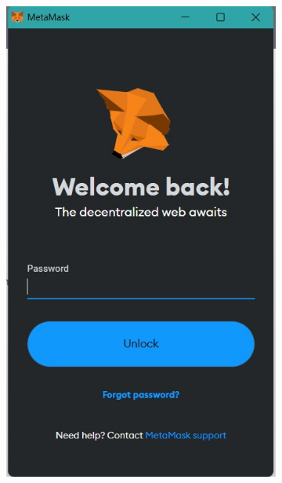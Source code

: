 \begin{figure} [H] \centering
  \centering
  \begin{subfigure}{0.45\textwidth}
      \includegraphics[scale=0.35]{gambar/integrasi_metamask.jpg}
      \caption{}
      \label{fig:intg_a}
  \end{subfigure}
  \hspace{5pt}
  \begin{subfigure}{0.45\textwidth}

\end{subfigure}
\end{figure}
